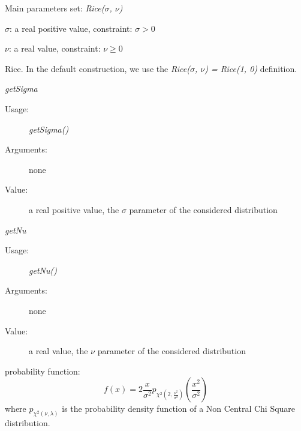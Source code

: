 \begin{description}

\item[Usage:] Main parameters set: \textit{Rice($\sigma$, $\nu$)}

\item[Arguments:]  \rule{0pt}{1em}
\begin{description}
\item $\sigma$:  a real positive value, constraint: $\sigma > 0$
\item $\nu$:  a real value, constraint: $\nu \geq 0$
\end{description}

\item[Value:] Rice. In the default construction, we use the \textit{Rice($\sigma$, $\nu$) = Rice(1, 0)} definition.

\item[Some methods:]  \rule{0pt}{1em}
\begin{description}

\item \textit{getSigma}
\begin{description}
\item[Usage:] \textit{getSigma()}
\item[Arguments:] none
\item[Value:]  a real positive value, the  $\sigma$ parameter of the considered distribution
\end{description}
\bigskip
\item \textit{getNu}
\begin{description}
\item[Usage:] \textit{getNu()}
\item[Arguments:] none
\item[Value:]  a real value, the  $\nu$ parameter of the considered distribution
\end{description}
\bigskip
\end{description}

\item[Details:]  \rule{0pt}{1em}
\begin{description}
\item probability function:
\begin{equation}
f(x) =  \displaystyle 2\frac{x}{\sigma^2}p_{\chi^2(2,\frac{\nu^2}{\sigma^2})}(\frac{x^2}{\sigma^2})
\end{equation}
where $p_{\chi^2(\nu, \lambda)}$ is the probability density function of a Non Central Chi Square distribution.

\end{description}

\item[Links:]  \rule{0pt}{1em}
\end{description}

